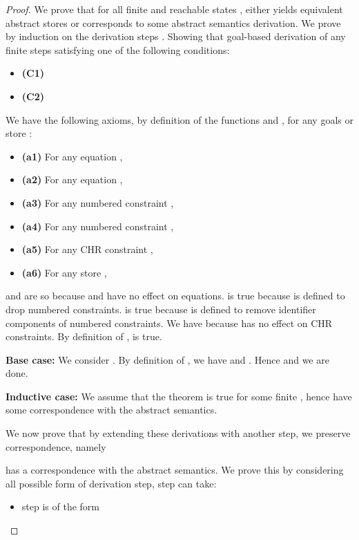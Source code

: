 \documentclass{tlp}
\begin{document}
\begin{proof}
  We prove that for all finite  and reachable states , 
   either yields equivalent abstract stores or 
  corresponds to some abstract semantics derivation. We prove by induction on the derivation steps . 
  Showing that goal-based derivation of any finite  steps satisfying one of the following conditions: 
  
  \begin{itemize}
	  \item {\bf (C1)} 
	  \item {\bf (C2)} 
  \end{itemize}
  
  We have the following axioms, by definition of the functions  and , for any goals 
  or store :
  
  \begin{itemize}
	  \item {\bf (a1)} For any equation , 
	  \item {\bf (a2)} For any equation , 
	  \item {\bf (a3)} For any numbered constraint , 
	  \item {\bf (a4)} For any numbered constraint , 
	  \item {\bf (a5)} For any CHR constraint ,  
	  \item {\bf (a6)} For any store , 
  \end{itemize}
  
   and  are so because  and  have no effect on equations.  is true
  because  is defined to drop numbered constraints.  is true because  is
  defined to remove identifier components of numbered constraints. We have  because  has
  no effect on CHR constraints. By definition of ,  is true.
  
  {\bf Base case:} We consider . By
  definition of , we have  and . Hence 
   and we are done.
  
  {\bf Inductive case:} We assume that the theorem is true for some finite ,
  hence  have some correspondence
  with the abstract semantics. 
  
  We now prove that by extending these  derivations with another step, we
  preserve correspondence, namely
  
  has a correspondence with the abstract semantics. We prove this by considering all
  possible form of derivation step, step  can take:
  
  \begin{itemize}
	  \item {}  step is of the form 
	       

\end{itemize}
\end{proof}
\end{document}
